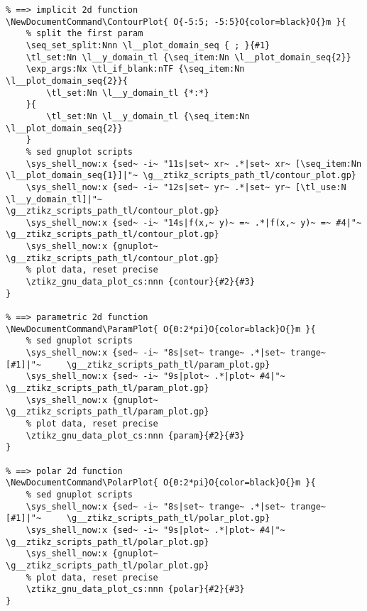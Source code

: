 \begin{verbatim}
% ==> implicit 2d function
\NewDocumentCommand\ContourPlot{ O{-5:5; -5:5}O{color=black}O{}m }{
	% split the first param
    \seq_set_split:Nnn \l__plot_domain_seq { ; }{#1}
    \tl_set:Nn \l__y_domain_tl {\seq_item:Nn \l__plot_domain_seq{2}}
    \exp_args:Nx \tl_if_blank:nTF {\seq_item:Nn \l__plot_domain_seq{2}}{
        \tl_set:Nn \l__y_domain_tl {*:*}
    }{
        \tl_set:Nn \l__y_domain_tl {\seq_item:Nn \l__plot_domain_seq{2}}
    }
    % sed gnuplot scripts
    \sys_shell_now:x {sed~ -i~ "11s|set~ xr~ .*|set~ xr~ [\seq_item:Nn \l__plot_domain_seq{1}]|"~ \g__ztikz_scripts_path_tl/contour_plot.gp}
    \sys_shell_now:x {sed~ -i~ "12s|set~ yr~ .*|set~ yr~ [\tl_use:N \l__y_domain_tl]|"~           \g__ztikz_scripts_path_tl/contour_plot.gp}
    \sys_shell_now:x {sed~ -i~ "14s|f(x,~ y)~ =~ .*|f(x,~ y)~ =~ #4|"~                            \g__ztikz_scripts_path_tl/contour_plot.gp}
    \sys_shell_now:x {gnuplot~                                                                    \g__ztikz_scripts_path_tl/contour_plot.gp}
    % plot data, reset precise
    \ztikz_gnu_data_plot_cs:nnn {contour}{#2}{#3}
}

% ==> parametric 2d function
\NewDocumentCommand\ParamPlot{ O{0:2*pi}O{color=black}O{}m }{
    % sed gnuplot scripts
    \sys_shell_now:x {sed~ -i~ "8s|set~ trange~ .*|set~ trange~ [#1]|"~     \g__ztikz_scripts_path_tl/param_plot.gp}
    \sys_shell_now:x {sed~ -i~ "9s|plot~ .*|plot~ #4|"~                     \g__ztikz_scripts_path_tl/param_plot.gp}
    \sys_shell_now:x {gnuplot~                                              \g__ztikz_scripts_path_tl/param_plot.gp}
    % plot data, reset precise
    \ztikz_gnu_data_plot_cs:nnn {param}{#2}{#3}
}

% ==> polar 2d function
\NewDocumentCommand\PolarPlot{ O{0:2*pi}O{color=black}O{}m }{
    % sed gnuplot scripts
    \sys_shell_now:x {sed~ -i~ "8s|set~ trange~ .*|set~ trange~ [#1]|"~     \g__ztikz_scripts_path_tl/polar_plot.gp}
    \sys_shell_now:x {sed~ -i~ "9s|plot~ .*|plot~ #4|"~                     \g__ztikz_scripts_path_tl/polar_plot.gp}
    \sys_shell_now:x {gnuplot~                                              \g__ztikz_scripts_path_tl/polar_plot.gp}
    % plot data, reset precise
    \ztikz_gnu_data_plot_cs:nnn {polar}{#2}{#3}
}


\end{verbatim}
